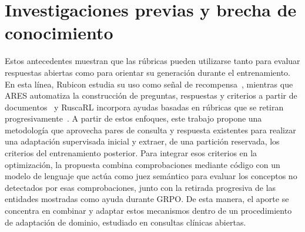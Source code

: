 \section{Investigaciones previas y brecha de conocimiento}
Estos antecedentes muestran que las rúbricas pueden utilizarse tanto para evaluar respuestas abiertas como para orientar su generación durante el entrenamiento. En esta línea, Rubicon estudia su uso como señal de recompensa~\cite{huang2025rubicon}, mientras que ARES automatiza la construcción de preguntas, respuestas y criterios a partir de documentos~\cite{li2026ares} y RuscaRL incorpora ayudas basadas en rúbricas que se retiran progresivamente~\cite{zhou2026ruscarl}. A partir de estos enfoques, este trabajo propone una metodología que aprovecha pares de consulta y respuesta existentes para realizar una adaptación supervisada inicial y extraer, de una partición reservada, los criterios del entrenamiento posterior. Para integrar esos criterios en la optimización, la propuesta combina comprobaciones mediante código con un modelo de lenguaje que actúa como juez semántico para evaluar los conceptos no detectados por esas comprobaciones, junto con la retirada progresiva de las entidades mostradas como ayuda durante GRPO. De esta manera, el aporte se concentra en combinar y adaptar estos mecanismos dentro de un procedimiento de adaptación de dominio, estudiado en consultas clínicas abiertas.

%
%
%
